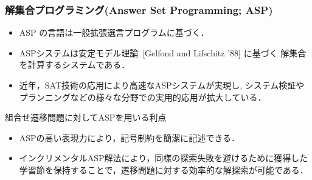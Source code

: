 \documentclass[dvipdfmx,11pt]{beamer}
\begin{document}
\begin{frame}\frametitle{解集合プログラミング(Answer Set Programming; ASP)}

  \begin{itemize}
    \item ASP の言語は一般拡張選言プログラムに基づく．
    \item ASPシステムは安定モデル理論~[Gelfond and Lifschitz '88] に基づく
          解集合を計算するシステムである．
    \item 近年，SAT技術の応用により高速なASPシステムが実現し, 
          システム検証やプランニングなどの様々な分野での実用的応用が拡大している．
  \end{itemize}

  \begin{alertblock}{組合せ遷移問題に対してASPを用いる利点}
    \begin{itemize}
      \item ASPの高い表現力により，記号制約を簡潔に記述できる．
      \item インクリメンタルASP解法により，同様の探索失敗を避けるために獲得した学習節を保持することで，遷移問題に対する効率的な解探索が可能である．
    \end{itemize}
  \end{alertblock}
  
\end{frame}
\end{document}
